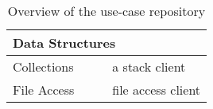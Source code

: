 \begin{table}
\begin{center}
\begin{tabular}{|l|l|l|l|}
	\hline
	\multicolumn{4}{|l|}{ \textbf{Data Structures}}
	\\
	\hline
	Collections & \cite{citation_needed} & \TypeState  & a stack client
	\\
	File Access & \cite{citation_needed} & \TypeState & file access client
	\\
	\hline
\end{tabular}
\end{center}
\caption{Overview of the use-case repository }
\label{table:use_cases_all}
\end{table}

